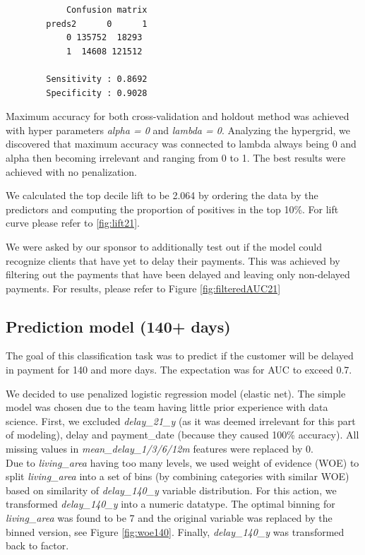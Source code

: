 \documentclass[
]{article}
\begin{document}
\begin{verbatim}
            Confusion matrix
        preds2      0      1
            0 135752  18293
            1  14608 121512
            
        Sensitivity : 0.8692          
        Specificity : 0.9028 
\end{verbatim}

Maximum accuracy for both cross-validation and holdout method was achieved with hyper parameters \emph{alpha = 0} and \emph{lambda = 0}. Analyzing the hypergrid, we discovered that maximum accuracy was connected to lambda always being 0 and alpha then becoming irrelevant and ranging from 0 to 1. The best results were achieved with no penalization.

We calculated the top decile lift to be 2.064 by ordering the data by the predictors and computing the proportion of positives in the top 10\%. For lift curve please refer to \ref{fig:lift21}.

We were asked by our sponsor to additionally test out if the model could recognize clients that have yet to delay their payments. This was achieved by filtering out the payments that have been delayed and leaving only non-delayed payments. For results, please refer to Figure \ref{fig:filteredAUC21}

\hypertarget{prediction-model-140-days}{%
\subsection{Prediction model (140+ days)}\label{prediction-model-140-days}}

The goal of this classification task was to predict if the customer will be delayed in payment for 140 and more days. The expectation was for AUC to exceed 0.7.

We decided to use penalized logistic regression model (elastic net). The simple model was chosen due to the team having little prior experience with data science. First, we excluded \emph{delay\_21\_y} (as it was deemed irrelevant for this part of modeling), delay and payment\_date (because they caused 100\% accuracy). All missing values in \emph{mean\_delay\_1/3/6/12m} features were replaced by 0.\\
Due to \emph{living\_area} having too many levels, we used weight of evidence (WOE) to split \emph{living\_area} into a set of bins (by combining categories with similar WOE) based on similarity of \emph{delay\_140\_y} variable distribution. For this action, we transformed \emph{delay\_140\_y} into a numeric datatype. The optimal binning for \emph{living\_area} was found to be 7 and the original variable was replaced by the binned version, see Figure \ref{fig:woe140}. Finally, \emph{delay\_140\_y} was transformed back to factor.
\end{document}
